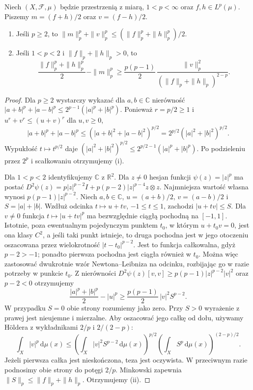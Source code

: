 \begin{lemat}
\label{lem:midpoint-lp-15}
Niech $(X,\mathcal F,\mu)$ będzie przestrzenią z miarą,
$1<p<\infty$ oraz $f,h\in L^p(\mu)$. Piszemy
$m=(f+h)/2$ oraz $v=(f-h)/2$.
\begin{enumerate}[label=\textup{(\roman*)}]
\item Jeśli $p\ge2$, to
$\|m\|_p^p+\|v\|_p^p\le(\|f\|_p^p+\|h\|_p^p)/2$.
\item Jeśli $1<p<2$ i $\|f\|_p+\|h\|_p>0$, to
\begin{equation}\label{eq:midpoint-low-15}
\frac{\|f\|_p^p+\|h\|_p^p}{2}-\|m\|_p^p
\ge \frac{p(p-1)}2\,
\frac{\|v\|_p^2}{(\|f\|_p+\|h\|_p)^{2-p}}.
\end{equation}
\end{enumerate}
\end{lemat}
\begin{proof}
Dla $p\ge2$ wystarczy wykazać dla $a,b\in\mathbb C$ nierówność
$|a+b|^p+|a-b|^p\le2^{p-1}(|a|^p+|b|^p)$.
Ponieważ $r=p/2\ge1$ i $u^r+v^r\le(u+v)^r$ dla $u,v\ge0$,
\[
|a+b|^p+|a-b|^p
\le (|a+b|^2+|a-b|^2)^{p/2}
=2^{p/2}(|a|^2+|b|^2)^{p/2}.
\]
Wypukłość $t\mapsto t^{p/2}$ daje
$(|a|^2+|b|^2)^{p/2}\le2^{p/2-1}(|a|^p+|b|^p)$.
Po podzieleniu przez $2^p$ i scałkowaniu otrzymujemy (i).

Dla $1<p<2$ identyfikujemy $\mathbb C$ z $\mathbb R^2$.
Dla $z\ne0$ hesjan funkcji $\psi(z)=|z|^p$ ma postać
$D^2\psi(z)=p|z|^{p-2}I+p(p-2)|z|^{p-4}z\otimes z$.
Najmniejsza wartość własna wynosi
$p(p-1)|z|^{p-2}$. Niech $a,b\in\mathbb C$,
$u=(a+b)/2$, $v=(a-b)/2$ i $S=|a|+|b|$.
Wzdłuż odcinka $t\mapsto u+tv$, $-1\le t\le1$,
zachodzi $|u+tv|\le S$. Dla $v\ne0$ funkcja
$t\mapsto |u+tv|^p$ ma bezwzględnie ciągłą pochodną
na $[-1,1]$. Istotnie, poza ewentualnym pojedynczym
punktem $t_0$, w którym $u+t_0v=0$, jest ona klasy $C^2$,
a jeśli taki punkt istnieje, to druga pochodna jest
w jego otoczeniu oszacowana przez wielokrotność
$|t-t_0|^{p-2}$. Jest to funkcja całkowalna, gdyż
$p-2>-1$; ponadto pierwsza pochodna jest ciągła
również w $t_0$. Można więc zastosować dwukrotnie
wzór Newtona--Leibniza na odcinku, rozbijając go
w razie potrzeby w punkcie $t_0$. Z nierówności
$D^2\psi(z)[v,v]\ge p(p-1)|z|^{p-2}|v|^2$
oraz $p-2<0$ otrzymujemy
\[
\frac{|a|^p+|b|^p}{2}-|u|^p
\ge \frac{p(p-1)}2\,|v|^2S^{p-2}.
\]
W przypadku $S=0$ obie strony rozumiemy jako zero.
Przy $S>0$ wyrażenie z prawej jest nieujemne i mierzalne.
Aby oszacować jego całkę od dołu, używamy Höldera
z wykładnikami $2/p$ i $2/(2-p)$:
\[
\int_X|v|^p\,\mathrm d\mu(x)
\le\left(\int_X |v|^2S^{p-2}\,\mathrm d\mu(x)\right)^{p/2}
\left(\int_XS^p\,\mathrm d\mu(x)\right)^{(2-p)/2}.
\]
Jeżeli pierwsza całka jest nieskończona, teza jest oczywista.
W przeciwnym razie podnosimy obie strony do potęgi $2/p$.
Minkowski zapewnia $\|S\|_p\le\|f\|_p+\|h\|_p$.
Otrzymujemy (ii).
\end{proof}

